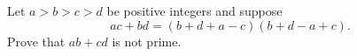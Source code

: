 Let $a > b > c > d$ be positive integers and suppose \[ ac + bd = (b+d+a-c)(b+d-a+c). \] Prove that $ab+cd$ is not prime.
